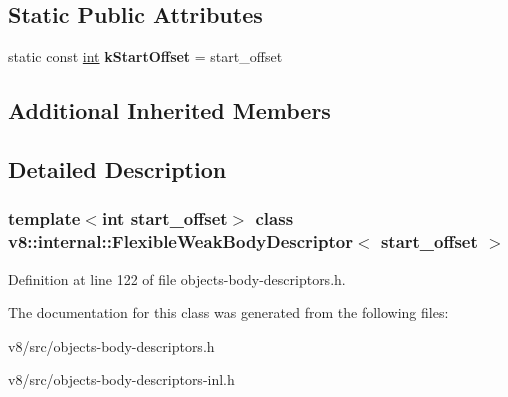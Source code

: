 \subsection*{Static Public Attributes}
\begin{DoxyCompactItemize}
\item 
\mbox{\label{classv8_1_1internal_1_1FlexibleWeakBodyDescriptor_a808c71ccf7c101083e7a3b42e34dc1dd}} 
static const \mbox{\hyperlink{classint}{int}} {\bfseries k\+Start\+Offset} = start\+\_\+offset
\end{DoxyCompactItemize}
\subsection*{Additional Inherited Members}


\subsection{Detailed Description}
\subsubsection*{template$<$int start\+\_\+offset$>$\newline
class v8\+::internal\+::\+Flexible\+Weak\+Body\+Descriptor$<$ start\+\_\+offset $>$}



Definition at line 122 of file objects-\/body-\/descriptors.\+h.



The documentation for this class was generated from the following files\+:\begin{DoxyCompactItemize}
\item 
v8/src/objects-\/body-\/descriptors.\+h\item 
v8/src/objects-\/body-\/descriptors-\/inl.\+h\end{DoxyCompactItemize}
